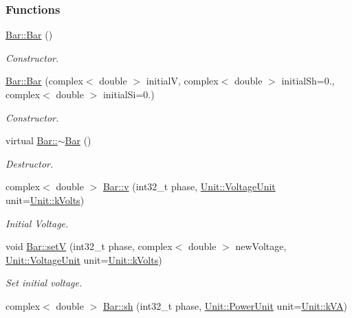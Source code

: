 \subsubsection*{Functions}
\begin{DoxyCompactItemize}
\item 
\hyperlink{group___models_ga9cae2188fcc6cce41caa7898c64548d1}{Bar\+::\+Bar} ()
\begin{DoxyCompactList}\small\item\em Constructor. \end{DoxyCompactList}\item 
\hyperlink{group___models_gab1c5a81ad40dbc7ee745077b4f5c20d4}{Bar\+::\+Bar} (complex$<$ double $>$ initial\+V, complex$<$ double $>$ initial\+Sh=0., complex$<$ double $>$ initial\+Si=0.)
\begin{DoxyCompactList}\small\item\em Constructor. \end{DoxyCompactList}\item 
virtual \hyperlink{group___models_ga9c7ebea0c189423591741ac438985316}{Bar\+::$\sim$\+Bar} ()
\begin{DoxyCompactList}\small\item\em Destructor. \end{DoxyCompactList}\item 
complex$<$ double $>$ \hyperlink{group___models_ga1e6f2daec86407118656d88170d1adc2}{Bar\+::v} (int32\+\_\+t phase, \hyperlink{class_unit_a55b07dfa9457e1eca2c7194fe0cfc3c1}{Unit\+::\+Voltage\+Unit} unit=\hyperlink{class_unit_a55b07dfa9457e1eca2c7194fe0cfc3c1aa54b2473993a702a3923525765bd6e4c}{Unit\+::k\+Volts})
\begin{DoxyCompactList}\small\item\em Initial Voltage. \end{DoxyCompactList}\item 
void \hyperlink{group___models_ga9b6fbc92674bfcdc9d5090795ab335a6}{Bar\+::set\+V} (int32\+\_\+t phase, complex$<$ double $>$ new\+Voltage, \hyperlink{class_unit_a55b07dfa9457e1eca2c7194fe0cfc3c1}{Unit\+::\+Voltage\+Unit} unit=\hyperlink{class_unit_a55b07dfa9457e1eca2c7194fe0cfc3c1aa54b2473993a702a3923525765bd6e4c}{Unit\+::k\+Volts})
\begin{DoxyCompactList}\small\item\em Set initial voltage. \end{DoxyCompactList}\item 
complex$<$ double $>$ \hyperlink{group___models_gac188071bf5f165b0acdaa4c8af82355c}{Bar\+::sh} (int32\+\_\+t phase, \hyperlink{class_unit_ace265ae255370ccacfd5370337572c3b}{Unit\+::\+Power\+Unit} unit=\hyperlink{class_unit_ace265ae255370ccacfd5370337572c3ba72b181a842ae2759488a2fa1410d3696}{Unit\+::k\+V\+A})

\end{DoxyCompactItemize}
